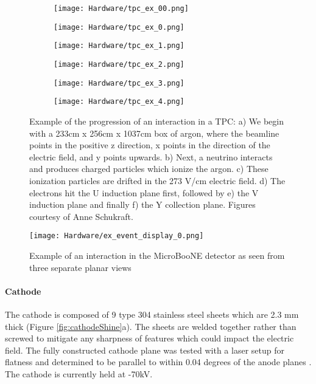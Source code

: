 \begin{figure}[H]
\centering
  \begin{subfigure}[t]{0.3\textwidth}
    \centering
\texttt{[image: Hardware/tpc\_ex\_00.png]}
  \caption{ }
  \end{subfigure} 
  \begin{subfigure}[t]{0.3\textwidth}
    \centering
\texttt{[image: Hardware/tpc\_ex\_0.png]}
  \caption{ }
  \end{subfigure} 
  \begin{subfigure}[t]{0.3\textwidth}
    \centering
\texttt{[image: Hardware/tpc\_ex\_1.png]}
  \caption{ }
  \end{subfigure} 
    \begin{subfigure}[t]{0.3\textwidth}
    \centering
\texttt{[image: Hardware/tpc\_ex\_2.png]}
  \caption{ }
  \end{subfigure} 
  \begin{subfigure}[t]{0.3\textwidth}
    \centering
\texttt{[image: Hardware/tpc\_ex\_3.png]}
  \caption{ }
  \end{subfigure} 
  \begin{subfigure}[t]{0.25\textwidth}
    \centering
\texttt{[image: Hardware/tpc\_ex\_4.png]}
  \caption{ }
  \end{subfigure} 

\caption{ Example of the progression of an interaction in a TPC: a) We begin with a 233cm x 256cm x 1037cm box of argon, where the beamline points in the positive z direction, x points in the direction of the electric field, and y points upwards.  b) Next, a neutrino interacts and produces charged particles which ionize the argon. c) These ionization particles are drifted in the 273 V/cm electric field. d) The electrons hit the U induction plane first, followed by e) the V induction plane and finally f) the Y collection plane. Figures courtesy of Anne Schukraft.}
\label{fig:ex_tpc_event_progression}
\end{figure}


\begin{figure}[H]
\centering
\texttt{[image: Hardware/ex\_event\_display\_0.png]}

\caption{ Example of an interaction in the MicroBooNE detector as seen from three separate planar views }
\label{fig:ex_tpc_event}
\end{figure}



\paragraph{Cathode} 
\par The cathode is composed of 9 type 304 stainless steel sheets which are 2.3 mm thick (Figure \ref{fig:cathodeShine}a).  The sheets are welded together rather than screwed to mitigate any sharpness of features which could impact the electric field. The fully constructed cathode plane was tested with a laser setup for flatness and determined to be parallel to within 0.04 degrees of the anode planes \cite{bib:uboone_JINST} . The cathode is currently held at -70kV.  

